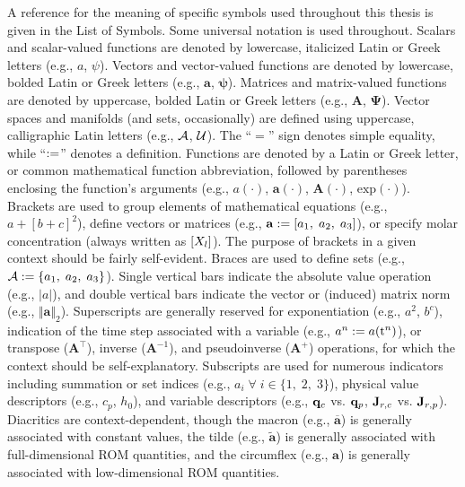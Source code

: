 A reference for the meaning of specific symbols used throughout this thesis is given in the List of Symbols. Some universal notation is used throughout. Scalars and scalar-valued functions are denoted by lowercase, italicized Latin or Greek letters (e.g., $a$, $\psi$). Vectors and vector-valued functions are denoted by lowercase, bolded Latin or Greek letters (e.g., $\mathbf{a}$, $\boldsymbol{\psi}$). Matrices and matrix-valued functions are denoted by uppercase, bolded Latin or Greek letters (e.g., $\mathbf{A}$, $\boldsymbol{\Psi}$). Vector spaces and manifolds (and sets, occasionally) are defined using uppercase, calligraphic Latin letters (e.g., $\mathcal{A}$, $\mathcal{U}$). The ``$=$'' sign denotes simple equality, while ``$:=$'' denotes a definition. Functions are denoted by a Latin or Greek letter, or common mathematical function abbreviation, followed by parentheses enclosing the function's arguments (e.g., $a(\cdot)$, $\mathbf{a}(\cdot)$, $\mathbf{A}(\cdot)$, $\text{exp}(\cdot)$). Brackets are used to group elements of mathematical equations (e.g., $a + [b + c]^2$), define vectors or matrices (e.g., $\mathbf{a} := [a_1, \; a_2, \; a_3]$), or specify molar concentration (always written as $[X_{l}]$). The purpose of brackets in a given context should be fairly self-evident. Braces are used to define sets (e.g., $\mathcal{A} := \{a_1,\; a_2,\; a_3\}$). Single vertical bars indicate the absolute value operation (e.g., $|a|$), and double vertical bars indicate the vector or (induced) matrix norm (e.g., $\Vert \mathbf{a} \Vert_2$). Superscripts are generally reserved for exponentiation (e.g., $a^2$, $b^c$), indication of the time step associated with a variable (e.g., $a^{n} := a(\text{t}^{n})$), or transpose ($\mathbf{A}^\top$), inverse ($\mathbf{A}^{-1}$), and pseudoinverse ($\mathbf{A}^+$) operations, for which the context should be self-explanatory. Subscripts are used for numerous indicators including summation or set indices (e.g., $a_{i} \; \forall \; i \in \{1,\; 2,\; 3\}$), physical value descriptors (e.g., $c_p$, $h_0$), and variable descriptors (e.g., $\mathbf{q}_{c}$ vs. $\mathbf{q}_{p}$, $\mathbf{J}_{r,c}$ vs. $\mathbf{J}_{r,p}$). Diacritics are context-dependent, though the macron (e.g., $\mathbf{\overline{a}}$) is generally associated with constant values, the tilde (e.g., $\mathbf{\widetilde{a}}$) is generally associated with full-dimensional ROM quantities, and the circumflex (e.g., $\mathbf{\widehat{a}}$) is generally associated with low-dimensional ROM quantities.